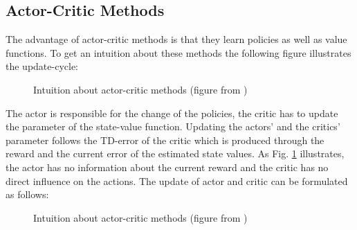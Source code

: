 \subsection{Actor-Critic Methods}
\label{sec:actor-critic}
The advantage of actor-critic methods is that they learn policies as well as 
value functions. To get an intuition about these methods the following figure 
illustrates the update-cycle:
\begin{figure}[H]
	\centering
	\caption{Intuition about actor-critic methods (figure from 
	\cite{sutton2018reinforcement})}
	\label{fig:actor-critic}
\end{figure}
The actor is responsible for the change of the policies, the critic has to 
update the parameter of the state-value function. Updating the actors' and the 
critics' parameter follows the TD-error of the critic which is produced through 
the reward and the current error of the estimated state values. As Fig. 
\ref{fig:actor-critic} illustrates, the actor has no information about the 
current reward and the critic has no direct influence on the actions.  
The update of actor and critic can be formulated as follows:
\begin{figure}[H]
	\centering
	\caption{Intuition about actor-critic methods (figure from 
		\cite{sutton2018reinforcement})}
	\label{fig:actor-critic-algo}
\end{figure}

